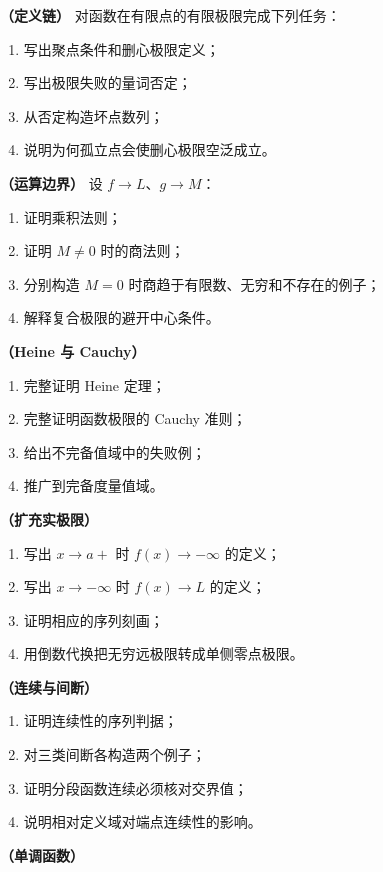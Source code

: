 \begin{enumerate}[label=\textbf{III.\arabic*.}]
  \mustdo\textbf{（定义链）} 对函数在有限点的有限极限完成下列任务：
 \begin{enumerate}
  \item 写出聚点条件和删心极限定义；
  \item 写出极限失败的量词否定；
  \item 从否定构造坏点数列；
  \item 说明为何孤立点会使删心极限空泛成立。
 \end{enumerate}
  \mustdo\textbf{（运算边界）} 设 \(f\to L\)、\(g\to M\)：
 \begin{enumerate}
  \item 证明乘积法则；
  \item 证明 \(M\ne0\) 时的商法则；
  \item 分别构造 \(M=0\) 时商趋于有限数、无穷和不存在的例子；
  \item 解释复合极限的避开中心条件。
 \end{enumerate}
  \mustdo\textbf{（Heine 与 Cauchy）}
 \begin{enumerate}
  \item 完整证明 Heine 定理；
  \item 完整证明函数极限的 Cauchy 准则；
  \item 给出不完备值域中的失败例；
  \item 推广到完备度量值域。
 \end{enumerate}
  \mustdo\textbf{（扩充实极限）}
 \begin{enumerate}
  \item 写出 \(x\to a+\) 时 \(f(x)\to-\infty\) 的定义；
  \item 写出 \(x\to-\infty\) 时 \(f(x)\to L\) 的定义；
  \item 证明相应的序列刻画；
  \item 用倒数代换把无穷远极限转成单侧零点极限。
 \end{enumerate}
  \mustdo\textbf{（连续与间断）}
 \begin{enumerate}
  \item 证明连续性的序列判据；
  \item 对三类间断各构造两个例子；
  \item 证明分段函数连续必须核对交界值；
  \item 说明相对定义域对端点连续性的影响。
 \end{enumerate}
  \mustdo\textbf{（单调函数）}

\end{enumerate}
